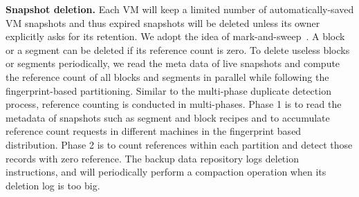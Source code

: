 {\bf Snapshot deletion.} Each VM will keep a limited number of  automatically-saved VM snapshots and thus
expired snapshots will be deleted unless its owner explicitly asks for its retention.
We adopt the idea of mark-and-sweep~\cite{Guo2011}. 
A block or a segment can be deleted if its reference count is zero.
To delete useless  blocks or segments periodically, we read the meta data  of live 
snapshots and compute the reference count of all blocks and segments  in parallel
while following the fingerprint-based partitioning.
Similar to the multi-phase duplicate detection process, reference counting is conducted in multi-phases. 
Phase  1 is to read  the metadata of snapshots such as segment and block
recipes and  to accumulate  reference count requests in different machines  in the fingerprint based distribution.
Phase   2 is to count references within each partition and detect those records with zero 
reference. 
The backup  data repository logs deletion instructions,  and will periodically perform a compaction operation when 
its deletion log is too big. 




